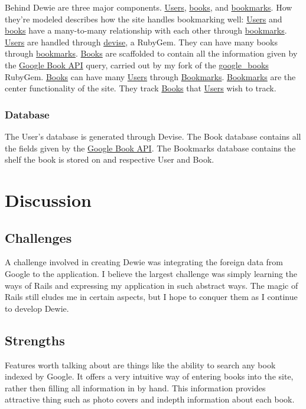 \documentclass[11pt]{article}
\begin{document}
   Behind Dewie are three major components.  \underline{Users}, \underline{books}, and \underline{bookmarks}.  How they're modeled describes how the site handles bookmarking well:  \underline{Users} and \underline{books} have a many-to-many relationship with each other through \underline{bookmarks}.
   \underline{Users} are handled through \href{https://github.com/plataformatec/devise}{devise}, a RubyGem.  They can have many books through \underline{bookmarks}.
   \underline{Books} are scaffolded to contain all the information given by the \href{http://code.google.com/apis/books/}{Google Book API} query, carried out by my fork of the \href{https://github.com/cjoelrun/google_books}{google\_books} RubyGem.  \underline{Books} can have many \underline{Users} through \underline{Bookmarks}.
   \underline{Bookmarks} are the center functionality of the site.  They track \underline{Books} that \underline{Users} wish to track. 
\subsubsection{Database}
\label{sec-4-2-1}

    The User's database is generated through Devise.  The Book database contains all the fields given by the \href{http://code.google.com/apis/books/}{Google Book API}.  The Bookmarks database contains the shelf the book is stored on and respective User and Book.
\section{Discussion}
\label{sec-5}
\subsection{Challenges}
\label{sec-5-1}

   A challenge involved in creating Dewie was integrating the foreign data from Google to the application.  I believe the largest challenge was simply learning the ways of Rails and expressing my application in such abstract ways.  The magic of Rails still eludes me in certain aspects, but I hope to conquer them as I continue to develop Dewie.
\subsection{Strengths}
\label{sec-5-2}

   Features worth talking about are things like the ability to search any book indexed by Google.  It offers a very intuitive way of entering books into the site, rather then filling all information in by hand.  This information provides attractive thing such as photo covers and indepth information about each book.
\end{document}
